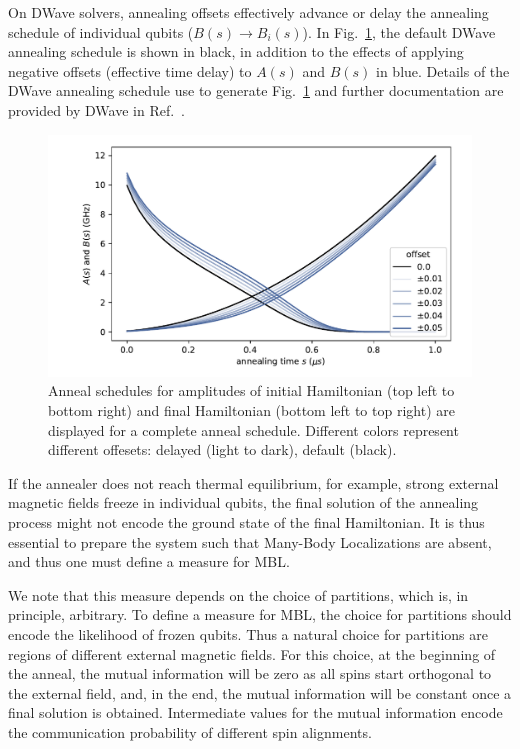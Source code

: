 \documentclass[prd,twocolumn,tightenlines,preprintnumbers,showpacs,superscriptaddress,notitlepage,nofootinbib,eqsecnum,floatfix,longbibliography,aps,10pt]{revtex4-2}
\begin{document}
On DWave solvers, annealing offsets effectively advance or delay the annealing schedule of individual qubits ($B(s) \to B_i(s)$).
In Fig.~\ref{fig:anneal_schedule}, the default DWave annealing schedule is shown in black, in addition to the effects of applying negative offsets (effective time delay) to $A(s)$ and $B(s)$ in blue.
Details of the DWave annealing schedule use to generate Fig.~\ref{fig:anneal_schedule} and further documentation are provided by DWave in Ref.~\cite{dwave_as, dwave_as_docu}.


\begin{figure}[htb]
 \centering
  \includegraphics[width=\columnwidth]{./new_figures/anneal_schedule.pdf}
  \caption{
  Anneal schedules for amplitudes of initial Hamiltonian (top left to bottom right) and final Hamiltonian (bottom left to top right) are displayed for a complete anneal schedule.
  Different colors represent different offesets: delayed (light to dark), default (black).
 }
 \label{fig:anneal_schedule}
\end{figure}

If the annealer does not reach thermal equilibrium, for example, strong external magnetic fields freeze in individual qubits, the final solution of the annealing process might not encode the ground state of the final Hamiltonian.
It is thus essential to prepare the system such that Many-Body Localizations are absent, and thus one must define a measure for MBL.

We note that this measure depends on the choice of partitions, which is, in principle, arbitrary.
To define a measure for MBL, the choice for partitions should encode the likelihood of frozen qubits.
Thus a natural choice for partitions are regions of different external magnetic fields.
For this choice, at the beginning of the anneal, the mutual information will be zero as all spins start orthogonal to the external field, and, in the end, the mutual information will be constant once a final solution is obtained.
Intermediate values for the mutual information encode the communication probability of different spin alignments.
\end{document}
